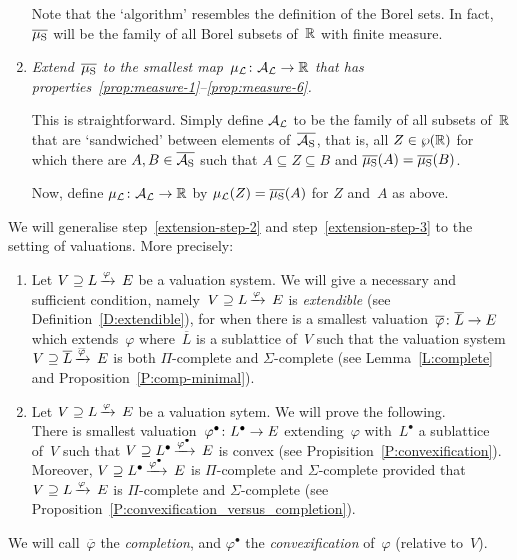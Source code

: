 \documentclass[main.tex]{subfiles}
\begin{document}
\begin{enumerate}
Note that the `algorithm' resembles the  definition
of the Borel sets.
In fact, $\overline{\mu_{\mathrm{S}}}$
will be the family of all Borel subsets of~$\mathbb{R}$
with finite measure.


\item
\label{extension-step-3}
\emph{Extend~$\overline{\mu_{\mathrm{S}}}$
to the smallest map~$\mu_{\mathcal{L}}\colon \mathcal{A}_{\mathcal{L}} \rightarrow \mathbb{R}$
that has properties~\ref{prop:measure-1}--\ref{prop:measure-6}.}

This is straightforward.
Simply
define $\mathcal{A}_{\mathcal{L}}$ to be the family of all subsets of~$\mathbb{R}$
that are `sandwiched' between elements of~$\overline{\mathcal{A}_{\mathrm{S}}}$,
that is,
all $Z\in\wp(\mathbb{R})$
for which
there are $A,B\in \overline{\mathcal{A}_{\mathrm{S}}}$
such that $A\subseteq Z\subseteq B$ and 
$\overline{\mu_{\mathrm{S}}}(A) = \overline{\mu_{\mathrm{S}}}(B)$.

Now, define $\mu_{\mathcal{L}}\colon \mathcal{A}_{\mathcal{L}} \rightarrow \mathbb{R}$
by $\mu_{\mathcal{L}} (Z) = \overline{\mu_{\mathrm{S}}} (A)$ for $Z$ and~$A$ as above.
\end{enumerate}

\noindent
We will generalise step~\ref{extension-step-2}
and step~\ref{extension-step-3}
to the setting of valuations.
More precisely:
\begin{enumerate}
\item
Let $V \supseteq L\,\smash{\xrightarrow{\varphi}\,E}$
be a valuation system.
We will give
a necessary and sufficient condition,
namely~$V \supseteq L\,\smash{\xrightarrow{\varphi}\,E}$
is \emph{extendible}
(see Definition~\ref{D:extendible}),
for when 
there is a smallest
valuation~$\overline\varphi\colon\overline{L}\rightarrow E$
which extends~$\varphi$
where~$\overline{L}$ is a sublattice of~$V$
such that the valuation system
$V \supseteq \overline{L}\,\smash{\xrightarrow{\overline\varphi}\,E}$
is both $\Pi$-complete and $\Sigma$-complete
(see Lemma~\ref{L:complete} and Proposition~\ref{P:comp-minimal}).

\item
Let $V \supseteq L\,\smash{\xrightarrow{\varphi}\,E}$
be a valuation sytem.
We will prove the following.\\
There is smallest valuation~$\varphi^\bullet\colon L^\bullet\rightarrow E$
extending~$\varphi$
with~$L^\bullet$ a sublattice of~$V$
such that 
$V \supseteq L^\bullet\,\smash{\xrightarrow{\varphi^\bullet}\,E}$ is convex
(see Propisition~\ref{P:convexification}).\\
Moreover,
$V \supseteq L^\bullet\,\smash{\xrightarrow{\varphi^\bullet}\,E}$
is $\Pi$-complete and $\Sigma$-complete
provided that
$V \supseteq L\,\smash{\xrightarrow{\varphi}\,E}$ 
is $\Pi$-complete and $\Sigma$-complete
(see Proposition~\ref{P:convexification_versus_completion}).

\end{enumerate}
We will call~$\overline\varphi$
the \emph{completion},
and $\varphi^\bullet$
the \emph{convexification} of~$\varphi$
(relative to~$V$).
\end{document}
